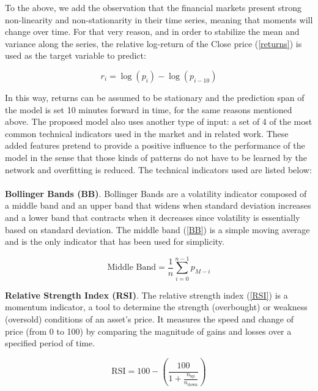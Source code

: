 \documentclass[10pt,twocolumn,letterpaper]{article}
\begin{document}
To the above, we add the observation that the financial markets present strong non-linearity and non-stationarity in their time series, meaning that moments will change over time. For that very reason, and in order to stabilize the mean and variance along the series, the relative log-return of the Close price (\ref{returns}) is used as the target variable to predict:

\begin{equation} \label{returns}
	r_i = \log(p_i) - \log(p_{i-10})
\end{equation}

In this way, returns can be assumed to be stationary and the prediction span of the model is set 10 minutes forward in time, for the same reasons mentioned above. The proposed model also uses another type of input: a set of 4 of the most common technical indicators used in the market and in related work. These added features pretend to provide a positive influence to the performance of the model in the sense that those kinds of patterns do not have to be learned by the network and overfitting is reduced. The technical indicators used are listed below:
\\\\
\indent\textbf{Bollinger Bands (BB)}.
Bollinger Bands are a volatility indicator composed of a middle band and an upper band that widens when standard deviation increases and a lower band that contracts when it decreases since volatility is essentially based on standard deviation. The middle band (\ref{BB}) is a simple moving average and is the only indicator that has been used for simplicity.

\begin{equation} \label{BB}
	\text{Middle Band} = \frac{1}{n} \sum_{i=0}^{n-1} p_{M-i}
\end{equation}

\textbf{Relative Strength Index (RSI)}.
The relative strength index (\ref{RSI}) is a momentum indicator, \ie a tool to determine the strength (overbought) or weakness (oversold) conditions of an asset’s price. It measures the speed and change of price (from 0 to 100) by comparing the magnitude of gains and losses over a specified period of time.

\begin{equation} \label{RSI}
	\text{RSI} = 100 - (\frac{100}{1+\frac{n_{\text{up}}}{n_\text{down}}})
\end{equation}
\end{document}

